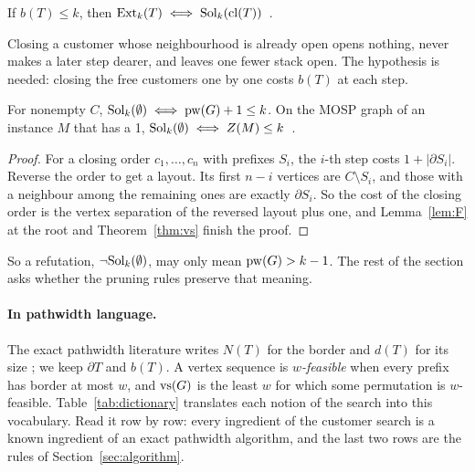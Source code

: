 \begin{lemma}\label{lem:F}
If $b(T)\le k$, then $\mathrm{Ext}_k(T)\iff\mathrm{Sol}_k(\mathrm{cl}(T))$~.
\end{lemma}
Closing a customer whose neighbourhood is already open opens nothing, never
makes a later step dearer, and leaves one fewer stack open. The hypothesis is
needed: closing the free customers one by one costs $b(T)$ at each step.

\begin{theorem}\label{thm:decides}
For nonempty $C$, $\mathrm{Sol}_k(\emptyset)\iff\mathrm{pw}(G)+1\le k$. On the MOSP graph of an
instance $M$ that has a 1, $\mathrm{Sol}_k(\emptyset)\iff Z(M)\le k$~.
\end{theorem}
\begin{proof}
For a closing order $c_1,\dots,c_n$ with prefixes $S_i$, the $i$-th step costs
$1+|\partial S_i|$. Reverse the order to get a layout. Its first $n-i$
vertices are $C\setminus S_i$, and those with a neighbour among the remaining
ones are exactly $\partial S_i$. So the cost of the closing order is the vertex
separation of the reversed layout plus one, and Lemma~\ref{lem:F} at the root
and Theorem~\ref{thm:vs} finish the proof.
\end{proof}

So a refutation, $\neg\mathrm{Sol}_k(\emptyset)$, may only mean $\mathrm{pw}(G)>k-1$. The rest
of the section asks whether the pruning rules preserve that meaning.

\paragraph{In pathwidth language.} The exact pathwidth literature writes
$N(T)$ for the border and $d(T)$ for its size
\citep[p.~390]{KobayashiKomuroTamaki2014}; we keep $\partial T$ and $b(T)$. A
vertex sequence is \emph{$w$-feasible} when every prefix has border at most
$w$, and $\mathrm{vs}(G)$ is the least $w$ for which some permutation is $w$-feasible.
Table~\ref{tab:dictionary} translates each notion of the search into this
vocabulary. Read it row by row: every ingredient of the customer search is a
known ingredient of an exact pathwidth algorithm, and the last two rows are
the rules of Section~\ref{sec:algorithm}.

